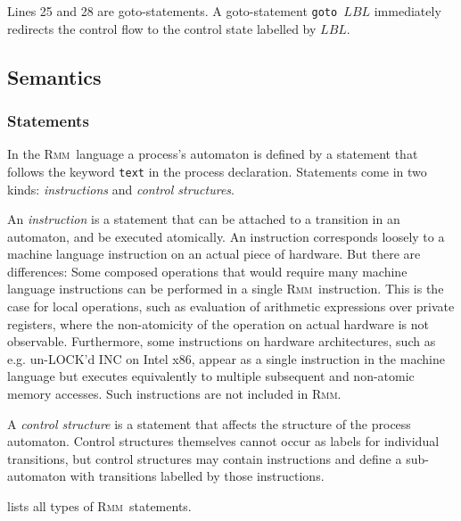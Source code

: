 \documentclass[a4paper]{article}
\newcommand{\rmm}{\textsc{Rmm}}
\begin{document}
Lines 25 and 28 are goto-statements. A goto-statement \verb+goto +$LBL$
immediately redirects the control flow to the control state labelled
by $LBL$.

\subsection{Semantics}\label{sec:semantics}
\subsubsection{Statements}

In the \rmm\ language a process's automaton is defined by a statement
that follows the keyword \verb+text+ in the process
declaration. Statements come in two kinds: \emph{instructions} and
\emph{control structures}.

An \emph{instruction} is a statement that can be attached to a
transition in an automaton, and be executed atomically. An instruction
corresponds loosely to a machine language instruction on an actual
piece of hardware. But there are differences: Some composed operations
that would require many machine language instructions can be performed
in a single \rmm\ instruction. This is the case for local operations,
such as evaluation of arithmetic expressions over private registers,
where the non-atomicity of the operation on actual hardware is not
observable. Furthermore, some instructions on hardware architectures,
such as e.g. un-LOCK'd INC on Intel x86, appear as a single
instruction in the machine language but executes equivalently to
multiple subsequent and non-atomic memory accesses. Such instructions
are not included in \rmm.

A \emph{control structure} is a statement that affects the structure
of the process automaton. Control structures themselves cannot occur
as labels for individual transitions, but control structures may
contain instructions and define a sub-automaton with transitions
labelled by those instructions.

 lists all types of \rmm\ statements.
\end{document}
